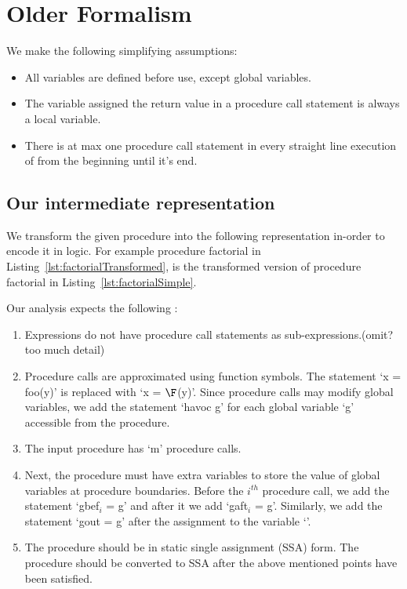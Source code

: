 \section{Older Formalism}

We make the following simplifying assumptions:
\begin{itemize}
\item All variables are defined before use, except global variables.
\item The variable assigned the return value in a procedure call
  statement is always a local variable.
\item There is at max one procedure call statement in every straight line
  execution of \foo from the beginning until it's end.
\end{itemize}


\subsection{Our intermediate representation}
\label{sec:intermediate}
We transform the given procedure into the following representation
in-order to encode it in logic. For example procedure factorial
in Listing~\ref{lst:factorialTransformed}, is the transformed version
of procedure factorial in Listing~\ref{lst:factorialSimple}.

Our analysis expects the following :
\begin{enumerate}
\item Expressions do not have procedure call statements as
  sub-expressions.(omit? too much detail)
\item Procedure calls are approximated using function symbols. The
  statement `x = foo(y)' is replaced with `x = $\F$(y)'. Since
  procedure calls may modify global variables, we add the statement
  `havoc g' for each global variable `g' accessible from the
  procedure.
\item The input procedure has `m' procedure calls.
\item Next, the procedure must have extra variables to store the value
  of global variables at procedure boundaries. Before the
  $\mathit{i^{th}}$ procedure call, we add the statement `gbef$_i$ =
  g' and after it we add `gaft$_i$ = g'. Similarly, we add the
  statement `gout = g' after the assignment to the variable `\retVar'.
\item The procedure should be in static single assignment (SSA)
  form. The procedure should be converted to SSA after the above
  mentioned points have been satisfied.
\end{enumerate}


